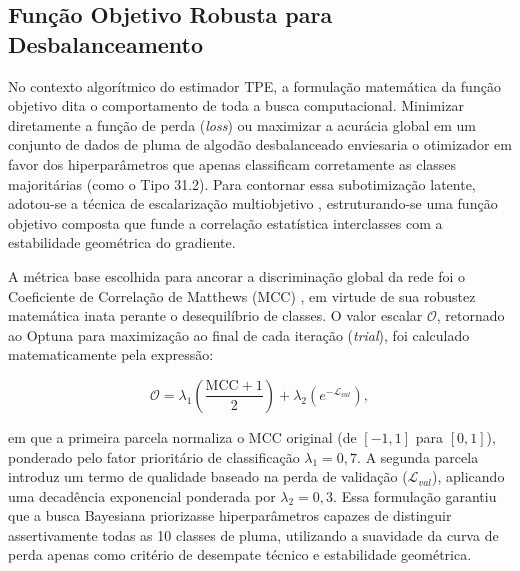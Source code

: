 \subsection{Função Objetivo Robusta para Desbalanceamento}

    No contexto algorítmico do estimador TPE, a formulação matemática da função objetivo dita o comportamento de toda a busca computacional. Minimizar diretamente a função de perda (\textit{loss}) ou maximizar a acurácia global em um conjunto de dados de pluma de algodão desbalanceado enviesaria o otimizador em favor dos hiperparâmetros que apenas classificam corretamente as classes majoritárias (como o Tipo 31.2). Para contornar essa subotimização latente, adotou-se a técnica de escalarização multiobjetivo \cite{knowles2006parego, paria2020escalarizacao}, estruturando-se uma função objetivo composta que funde a correlação estatística interclasses com a estabilidade geométrica do gradiente.

    A métrica base escolhida para ancorar a discriminação global da rede foi o Coeficiente de Correlação de Matthews (MCC) \cite{matthews1975comparison}, em virtude de sua robustez matemática inata perante o desequilíbrio de classes. O valor escalar $\mathcal{O}$, retornado ao Optuna para maximização ao final de cada iteração (\textit{trial}), foi calculado matematicamente pela expressão:

    $$ \mathcal{O} = \lambda_1 \left( \frac{\text{MCC} + 1}{2} \right) + \lambda_2 \left( e^{-\mathcal{L}_{val}} \right), $$
    
    \noindent em que a primeira parcela normaliza o MCC original (de $[-1, 1]$ para $[0, 1]$), ponderado pelo fator prioritário de classificação $\lambda_1 = 0,7$. A segunda parcela introduz um termo de qualidade baseado na perda de validação ($\mathcal{L}_{val}$), aplicando uma decadência exponencial ponderada por $\lambda_2 = 0,3$. Essa formulação garantiu que a busca Bayesiana priorizasse hiperparâmetros capazes de distinguir assertivamente todas as 10 classes de pluma, utilizando a suavidade da curva de perda apenas como critério de desempate técnico e estabilidade geométrica.